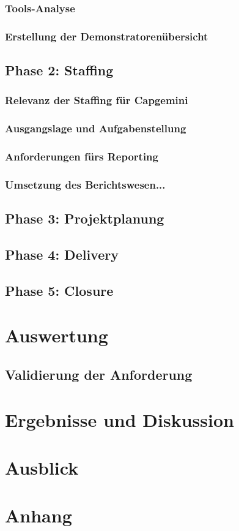 \documentclass[a4paper, 12pt]{scrartcl}
\begin{document}
	\subsubsection{Tools-Analyse}%
	\subsubsection{Erstellung der Demonstratorenübersicht}
	\newpage
	\subsection{Phase 2: Staffing}
	\subsubsection{Relevanz der Staffing für Capgemini}%
	\subsubsection{Ausgangslage und Aufgabenstellung}
	\subsubsection{Anforderungen fürs Reporting}
	\subsubsection{Umsetzung des Berichtswesen...}
	\newpage
	\subsection{Phase 3: Projektplanung}
	\newpage
	\subsection{Phase 4: Delivery}
	\newpage
	\subsection{Phase 5: Closure}
	\newpage
	\section{Auswertung}
	\subsection{Validierung der Anforderung}%
	\newpage
	\section{Ergebnisse und Diskussion}
	\newpage
	\section{Ausblick}
	
	\newpage
	\section{Anhang}
	
	
\end{document}
